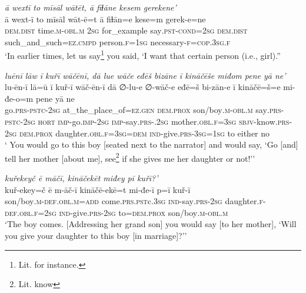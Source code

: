 \ea \label{ŽE.73}
\textit{ā wextī to mīsāl wātēt, ā fiɫāne kesem gerekene’} \\ 
\gll ā wext-ī to mīsāl wāt-ē=t ā fiɫān=e kese=m gerek-e=ne \\ 
 \textsc{dem.dist} time\textsc{.m}\textsc{-obl}\textsc{.m} \textsc{2sg} for\_example say\textsc{.pst}\textsc{-cond}\textsc{=\textsc{2sg}} \textsc{dem.dist} such\_and\_such\textsc{=ez}\textsc{.cmpd} person\textsc{.f}\textsc{=\textsc{1sg}} necessary\textsc{-f}\textsc{=cop}\textsc{.3sg}\textsc{.f} \\ 
\glt `In earlier times, let us say\footnote{Lit. for instance.} you said, ‘I want that certain person (i.e., girl).''
\z 
 
\ea \label{ŽE.74}
\textit{luēnī lāw ī kuřī wāčēnī, dā lue wāče eđēš bizāne ī kināčēše miđom pene yā ne’} \\ 
\gll lu-ēn-ī lā=ū ī kuř-ī wāč-ēn-ī dā ∅-lu-e ∅-wāč-e eđē=š bi-zān-e ī kināčē=š=e mi-đe-o=m pene yā ne \\ 
 go\textsc{.prs}\textsc{-pstc}-\textsc{2sg} at\_the\_place\_of\textsc{\textsc{=ez.gen}} \textsc{dem.prox} son/boy\textsc{.m}\textsc{-obl}\textsc{.m} say\textsc{.prs}\textsc{-pstc}-\textsc{2sg} \textsc{hort} \textsc{imp-}go.\textsc{imp-}\textsc{2sg} \textsc{imp-}say\textsc{.prs-}.\textsc{2sg} mother\textsc{.obl}\textsc{.f}\textsc{=3sg} \textsc{sbjv-}know\textsc{.prs}-\textsc{2sg} \textsc{dem.prox} daughter\textsc{.obl}\textsc{.f}\textsc{=3sg}\textsc{=dem} \textsc{ind-}give\textsc{.prs}\textsc{-3sg}\textsc{=\textsc{1sg}} to either no \\ 
\glt ` You would go to this boy [seated next to the narrator] and would say, ‘Go [and] tell her mother [about me], see\footnote{Lit. know} if she gives me her daughter or not!’'
\z 
 
\ea \label{ŽE.75}
\textit{kuřekeyč ē māčī, kināčekēt miđey pī kuřī?’} \\ 
\gll kuř-ekey=č ē m-āč-ī kināčē-ekē=t mi-đe-ī p=ī kuř-ī \\ 
 son/boy\textsc{.m}\textsc{-def}\textsc{.obl}\textsc{.m}\textsc{=add} come\textsc{.prs}\textsc{.pst}c\textsc{.3sg} \textsc{ind-}say\textsc{.prs}-\textsc{2sg} daughter\textsc{.f}\textsc{-def}\textsc{.obl}\textsc{.f}\textsc{=\textsc{2sg}} \textsc{ind-}give\textsc{.prs}-\textsc{2sg} to=\textsc{dem.prox} son/boy\textsc{.m}\textsc{-obl}\textsc{.m} \\ 
\glt `The boy comes. [Addressing her grand son] you would say [to her mother], ‘Will you give your daughter to this boy [in marriage]?’'
\z 
 
